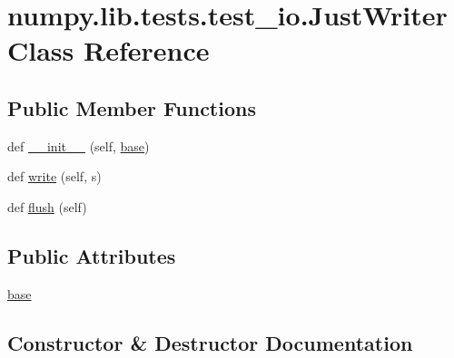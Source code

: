 \hypertarget{classnumpy_1_1lib_1_1tests_1_1test__io_1_1JustWriter}{}\section{numpy.\+lib.\+tests.\+test\+\_\+io.\+Just\+Writer Class Reference}
\label{classnumpy_1_1lib_1_1tests_1_1test__io_1_1JustWriter}
\subsection*{Public Member Functions}
\begin{DoxyCompactItemize}
\item 
def \hyperlink{classnumpy_1_1lib_1_1tests_1_1test__io_1_1JustWriter_a00e6e57125176d4f8cfa20e7542f5bc3}{\+\_\+\+\_\+init\+\_\+\+\_\+} (self, \hyperlink{classnumpy_1_1lib_1_1tests_1_1test__io_1_1JustWriter_a3b3beccc8ac51b892a950e996c5b9f0a}{base})
\item 
def \hyperlink{classnumpy_1_1lib_1_1tests_1_1test__io_1_1JustWriter_a376578d5fd9c62085ee36b5c7eb7b491}{write} (self, s)
\item 
def \hyperlink{classnumpy_1_1lib_1_1tests_1_1test__io_1_1JustWriter_a7339ab1216020ef714ea77b01b324513}{flush} (self)
\end{DoxyCompactItemize}
\subsection*{Public Attributes}
\begin{DoxyCompactItemize}
\item 
\hyperlink{classnumpy_1_1lib_1_1tests_1_1test__io_1_1JustWriter_a3b3beccc8ac51b892a950e996c5b9f0a}{base}
\end{DoxyCompactItemize}


\subsection{Constructor \& Destructor Documentation}
\mbox{\label{classnumpy_1_1lib_1_1tests_1_1test__io_1_1JustWriter_a00e6e57125176d4f8cfa20e7542f5bc3}} 
